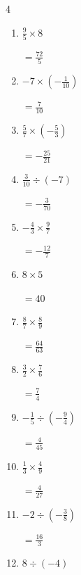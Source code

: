 \begin{multicols}{4}
\begin{enumerate}
        $\displaystyle =-\frac{64}{25}$

  \item $\displaystyle \frac{9}{5}\times{}8$

        $\displaystyle =\frac{72}{5}$

  \item $\displaystyle -7\times{}\left(-\frac{1}{10}\right)$

        $\displaystyle =\frac{7}{10}$

  \item $\displaystyle \frac{5}{7}\times{}\left(-\frac{5}{3}\right)$

        $\displaystyle =-\frac{25}{21}$

  \item $\displaystyle \frac{3}{10}\div{}\left(-7\right)$

        $\displaystyle =-\frac{3}{70}$

  \item $\displaystyle -\frac{4}{3}\times{}\frac{9}{7}$

        $\displaystyle =-\frac{12}{7}$

  \item $\displaystyle 8\times{}5$

        $\displaystyle =40$

\columnbreak %

  \item $\displaystyle \frac{8}{7}\times{}\frac{8}{9}$

        $\displaystyle =\frac{64}{63}$

  \item $\displaystyle \frac{3}{2}\times{}\frac{7}{6}$

        $\displaystyle =\frac{7}{4}$

  \item $\displaystyle -\frac{1}{5}\div{}\left(-\frac{9}{4}\right)$

        $\displaystyle =\frac{4}{45}$

  \item $\displaystyle \frac{1}{3}\times{}\frac{4}{9}$

        $\displaystyle =\frac{4}{27}$

  \item $\displaystyle -2\div{}\left(-\frac{3}{8}\right)$

        $\displaystyle =\frac{16}{3}$

  \item $\displaystyle 8\div{}\left(-4\right)$


\end{enumerate}
\end{multicols}
